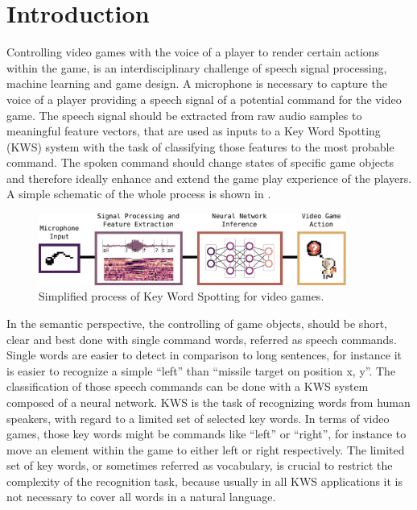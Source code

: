 
\chapter{Introduction}\label{sec:intro}
\thesisStateRevised
Controlling video games with the voice of a player to render certain actions within the game, is an interdisciplinary challenge of speech signal processing, machine learning and game design.
A microphone is necessary to capture the voice of a player providing a speech signal of a potential command for the video game.
The speech signal should be extracted from raw audio samples to meaningful feature vectors, that are used as inputs to a Key Word Spotting (KWS) system with the task of classifying those features to the most probable command.
The spoken command should change states of specific game objects and therefore ideally enhance and extend the game play experience of the players.
A simple schematic of the whole process is shown in .
\begin{figure}[!ht]
  \centering
    \includegraphics[width=0.9\textwidth]{./1_intro/figs/intro_kws}
  \caption{Simplified process of Key Word Spotting for video games.}
  \label{fig:intro_kws}
\end{figure}
\FloatBarrier
\noindent
In the semantic perspective, the controlling of game objects, should be short, clear and best done with single command words, referred as speech commands.
Single words are easier to detect in comparison to long sentences, for instance it is easier to recognize a simple \enquote{left} than \enquote{missile target on position x, y}.
The classification of those speech commands can be done with a KWS system composed of a neural network.
KWS is the task of recognizing words from human speakers, with regard to a limited set of selected key words.
In terms of video games, those key words might be commands like \enquote{left} or \enquote{right}, for instance to move an element within the game to either left or right respectively.
The limited set of key words, or sometimes referred as vocabulary, is crucial to restrict the complexity of the recognition task, because usually in all KWS applications it is not necessary to cover all words in a natural language.
